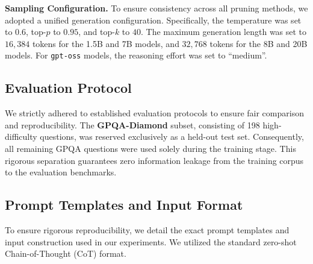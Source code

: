 \documentclass[11pt]{article}
\theoremstyle{plain}
\begin{document}
\noindent \textbf{Sampling Configuration.}
To ensure consistency across all pruning methods, we adopted a unified generation configuration.
Specifically, the temperature was set to $0.6$, top-$p$ to $0.95$, and top-$k$ to $40$.
The maximum generation length was set to $16{,}384$ tokens for the 1.5B and 7B models, and $32{,}768$ tokens for the 8B and 20B models.
For \texttt{gpt-oss} models, the reasoning effort was set to ``medium''.

\subsection{Evaluation Protocol}
\label{app:datasets}


We strictly adhered to established evaluation protocols to ensure fair comparison and reproducibility. The \textbf{GPQA-Diamond} subset, consisting of 198 high-difficulty questions, was reserved exclusively as a held-out test set. Consequently, all remaining GPQA questions were used solely during the training stage. This rigorous separation guarantees zero information leakage from the training corpus to the evaluation benchmarks.


\subsection{Prompt Templates and Input Format}
\label{app:prompts}

To ensure rigorous reproducibility, we detail the exact prompt templates and input construction used in our experiments. We utilized the standard zero-shot Chain-of-Thought (CoT) format.
\end{document}
